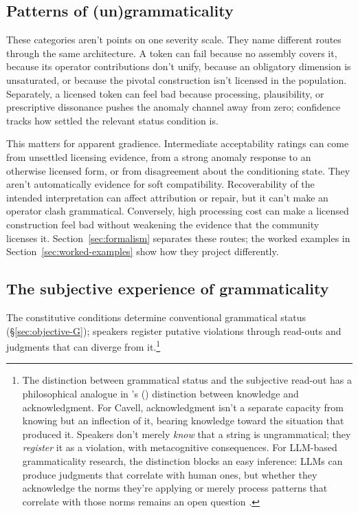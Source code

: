 \documentclass[12pt,letterpaper]{article}
\newcommand{\posscite}[1]{\citeauthor{#1}'s (\citeyear{#1})}
\begin{document}
\subsection{Patterns of (un)grammaticality}\label{sec:patterns}

These categories aren't points on one severity scale. They name different routes
through the same architecture. A token can fail because no
assembly covers it, because its operator contributions don't unify, because an
obligatory dimension is unsaturated, or because the pivotal construction isn't
licensed in the population. Separately, a licensed token can feel bad because
processing, plausibility, or prescriptive dissonance pushes the anomaly channel
away from zero; confidence tracks how settled the relevant status condition is.

This matters for apparent gradience. Intermediate acceptability ratings can
come from unsettled licensing evidence, from a strong anomaly response to an
otherwise licensed form, or from disagreement about the conditioning state.
They aren't automatically evidence for soft compatibility. Recoverability of
the intended interpretation can affect attribution or repair, but it can't
make an operator clash grammatical. Conversely, high processing cost can make
a licensed construction feel bad without weakening the evidence that the
community licenses it. Section~\ref{sec:formalism} separates these routes; the
worked examples in Section~\ref{sec:worked-examples} show how they project
differently.

\subsection{The subjective experience of grammaticality}\label{sec:subjective}

The constitutive conditions determine conventional grammatical status (\S\ref{sec:objective-G}); speakers register putative violations through read-outs and judgments that can diverge from it.\footnote{The distinction between grammatical status and the subjective read-out has a philosophical analogue in \posscite{Cavell1969KnowingAcknowledging} distinction between knowledge and acknowledgment. For Cavell, acknowledgment isn't a separate capacity from knowing but an inflection of it, bearing knowledge toward the situation that produced it. Speakers don't merely \emph{know} that a string is ungrammatical; they \emph{register} it as a violation, with metacognitive consequences. For LLM-based grammaticality research, the distinction blocks an easy inference: LLMs can produce judgments that correlate with human ones, but whether they acknowledge the norms they're applying or merely process patterns that correlate with those norms remains an open question \autocite{Techio2026ClaimTrainingData}.}
\end{document}
